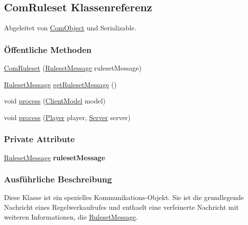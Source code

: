 \hypertarget{a00038}{\subsection{Com\-Ruleset Klassenreferenz}
\label{a00038}
}


Abgeleitet von \hyperlink{a00037}{Com\-Object} und Serializable.

\subsubsection*{Öffentliche Methoden}
\begin{DoxyCompactItemize}
\item 
\hyperlink{a00038_abd0ede642fb4c2daeecff71a44c8ac53}{Com\-Ruleset} (\hyperlink{a00053}{Ruleset\-Message} ruleset\-Message)
\item 
\hyperlink{a00053}{Ruleset\-Message} \hyperlink{a00038_a37ab2219f7218ea7420e038158d03a05}{get\-Ruleset\-Message} ()
\item 
void \hyperlink{a00038_a758d7005755a181717f238f714d87dd2}{process} (\hyperlink{a00003}{Client\-Model} model)
\item 
void \hyperlink{a00038_ac67b5ce3ec03d48ef1e6caad6e49c902}{process} (\hyperlink{a00076}{Player} player, \hyperlink{a00077}{Server} server)
\end{DoxyCompactItemize}
\subsubsection*{Private Attribute}
\begin{DoxyCompactItemize}
\item 
\hypertarget{a00038_a5c48ec3493553153b58479fc85a10e2f}{\hyperlink{a00053}{Ruleset\-Message} {\bfseries ruleset\-Message}}\label{a00038_a5c48ec3493553153b58479fc85a10e2f}

\end{DoxyCompactItemize}


\subsubsection{Ausführliche Beschreibung}
Diese Klasse ist ein spezielles Kommunikations-\/\-Objekt. Sie ist die grundlegende Nachricht eines Regelwerkaufrufes und enthaelt eine verfeinerte Nachricht mit weiteren Informationen, die \hyperlink{a00053}{Ruleset\-Message}. 


